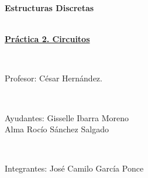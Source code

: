 \documentclass[12pt]{article}
\begin{document}
\begin{center}
{\LARGE \bf  Estructuras Discretas}\\

\

\underline{{\bf Práctica 2. Circuitos}}

\

Profesor: C\'esar Hern\'andez.

\

Ayudantes: Gisselle Ibarra Moreno \\
           Alma Roc\'io S\'anchez Salgado

\

Integrantes: José Camilo García Ponce

\

\end{center}
\end{document}
